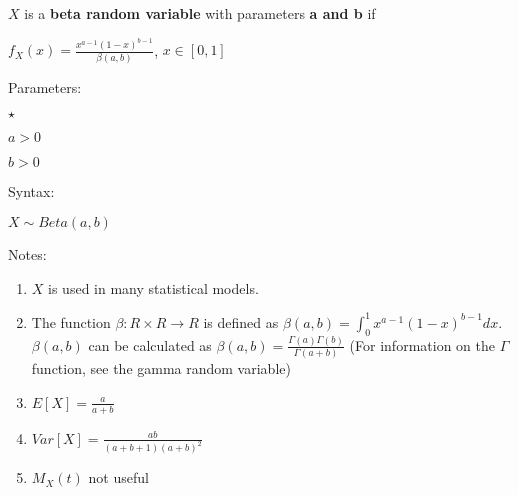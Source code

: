 \documentclass{article}
\begin{document}
$X$ is a \textbf{beta random variable} with parameters \textbf{a and b} if\\
\par
$f_X(x) = \frac{x^{a-1} (1-x)^{b-1} }{\beta(a,b)}$,     $x \in [0,1]$	\\
\par
Parameters:\\
\par
\begin{list}{$\star$ }{}
\item $a > 0$
\item $b > 0$
\end{list}
\par
Syntax:\\
\par
$X\sim Beta(a,b)$\\
\par
Notes:\\
\par
\begin{enumerate}

\item $X$ is used in many statistical models.
\item The function $\beta: R\times R \to R$ is defined as $\beta(a,b) = \int_{0}^{1}{x^{a-1} (1-x)^{b-1} dx}$. $\beta(a,b)$ can be calculated as $\beta(a,b) = \frac {\Gamma(a) \Gamma(b) } {\Gamma(a+b)}$ (For information on the $\Gamma$ function, see the gamma random variable) 
\item $E[X] = \frac{a}{a+b}$
\item $Var[X] = \frac{ab}{(a+b+1)(a+b)^2}$
\item $M_X(t)$ not useful

\end{enumerate}
\end{document}

